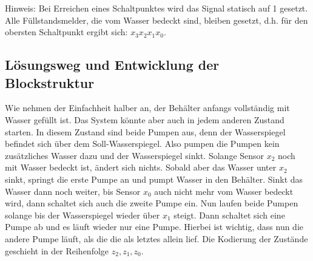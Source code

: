 \documentclass[a4paper,12pt,titlepage]{scrartcl}
\begin{document}
Hinweis: Bei Erreichen eines Schaltpunktes wird das Signal statisch auf 1 gesetzt. Alle Füllstandsmelder, die vom Wasser bedeckt sind, bleiben gesetzt, d.h. für den obersten Schaltpunkt ergibt sich: $x_3 x_2 x_1 x_0$.

\subsection*{Lösungsweg und Entwicklung der Blockstruktur}
Wie nehmen der Einfachheit halber an, der Behälter anfangs vollständig mit Wasser gefüllt ist. Das System könnte aber auch in jedem anderen Zustand starten. In diesem Zustand sind beide Pumpen aus, denn der Wasserspiegel befindet sich über dem Soll-Wasserspiegel. Also pumpen die Pumpen kein zusätzliches Wasser dazu und der Wasserspiegel sinkt. Solange Sensor $x_2$ noch mit Wasser bedeckt ist, ändert sich nichts. Sobald aber das Wasser unter $x_2$ sinkt, springt die erste Pumpe an und pumpt Wasser in den Behälter. Sinkt das Wasser dann noch weiter, bis Sensor $x_0$ auch nicht mehr vom Wasser bedeckt wird, dann schaltet sich auch die zweite Pumpe ein. Nun laufen beide Pumpen solange bis der Wasserspiegel wieder über $x_1$ steigt. Dann schaltet sich eine Pumpe ab und es läuft wieder nur eine Pumpe. Hierbei ist wichtig, dass nun die andere Pumpe läuft, als die die als letztes allein lief. Die Kodierung der Zustände geschieht in der Reihenfolge $z_2,z_1,z_0$.
\end{document}
